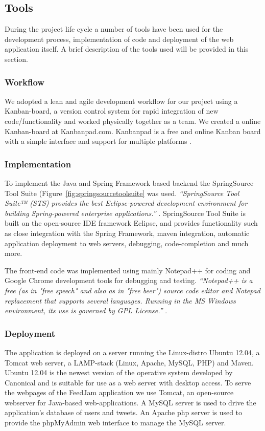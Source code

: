 \subsection{Tools} %
During the project life cycle a number of tools have been used for the development process, implementation of code and deployment of the web application itself. A brief description of the tools used will be provided in this section.


\subsubsection{Workflow}
We adopted a lean and agile development workflow for our project using a Kanban-board, a version control system for rapid integration of new code/functionality and worked physically together as a team. We created a online Kanban-board at Kanbanpad.com. Kanbanpad is a free and online Kanban board with a simple interface and support for multiple platforms \cite{TheHybridGroup2012}.

\subsubsection{Implementation}
To implement the Java and Spring Framework based backend the SpringSource Tool Suite (Figure~\ref{fig:springsourcetoolsuite} was used. \textit{``SpringSource Tool Suite™ (STS) provides the best Eclipse-powered development environment for building Spring-powered enterprise applications.''} \cite{SpringSource}. SpringSource Tool Suite is built on the open-source IDE framework Eclipse, and provides functionality such as close integration with the Spring Framework, maven integration, automatic application deployment to web servers, debugging, code-completion and much more.

The front-end code was implemented using mainly Notepad++ for coding and Google Chrome development tools for debugging and testing. \textit{``Notepad++ is a free (as in "free speech" and also as in "free beer") source code editor and Notepad replacement that supports several languages. Running in the MS Windows environment, its use is governed by GPL License.''} \cite{Ho2012}.

\subsubsection{Deployment}
The application is deployed on a server running the Linux-distro Ubuntu 12.04, a Tomcat web server, a LAMP-stack (Linux, Apache, MySQL, PHP) and Maven. Ubuntu 12.04 is the newest version of the operative system developed by Canonical and is suitable for use as a web server with desktop access. To serve the webpages of the FeedJam application we use Tomcat, an open-source webserver for Java-based web-applications. A MySQL server is used to drive the application's database of users and tweets. An Apache php server is used to provide the phpMyAdmin web interface to manage the MySQL server.

